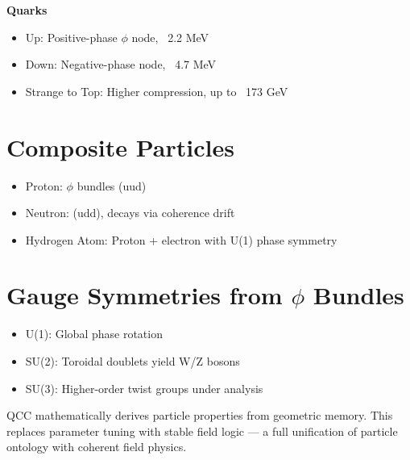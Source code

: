 \documentclass[12pt]{article}
\begin{document}
\textbf{Quarks}
\begin{itemize}
  \item Up: Positive-phase $\phi$ node, ~2.2 MeV
  \item Down: Negative-phase node, ~4.7 MeV
  \item Strange to Top: Higher compression, up to ~173 GeV
\end{itemize}

\section*{Composite Particles}
\begin{itemize}
  \item Proton: $\phi$ bundles (uud)
  \item Neutron: (udd), decays via coherence drift
  \item Hydrogen Atom: Proton + electron with U(1) phase symmetry
\end{itemize}

\section*{Gauge Symmetries from $\phi$ Bundles}
\begin{itemize}
  \item U(1): Global phase rotation
  \item SU(2): Toroidal doublets yield W/Z bosons
  \item SU(3): Higher-order twist groups under analysis
\end{itemize}

QCC mathematically derives particle properties from geometric memory. This replaces parameter tuning with stable field logic — a full unification of particle ontology with coherent field physics.
\end{document}
